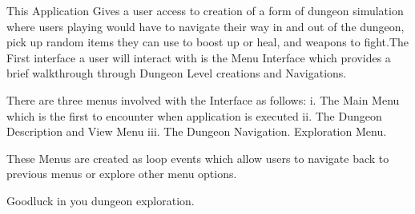 This Application Gives a user access to creation of a form of dungeon simulation where users playing would have to navigate their way in and out of the dungeon, pick up random items they can use to boost up or heal, and weapons to fight.\+The First interface a user will interact with is the Menu Interface which provides a brief walkthrough through Dungeon Level creations and Navigations.

There are three menus involved with the Interface as follows\+: i. The Main Menu which is the first to encounter when application is executed ii. The Dungeon Description and View Menu iii. The Dungeon Navigation. Exploration Menu.

These Menus are created as loop events which allow users to navigate back to previous menus or explore other menu options.

Goodluck in you dungeon exploration. 